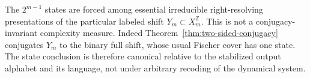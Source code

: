 \begin{remark}
The $2^{m-1}$ states are forced among essential irreducible right-resolving
presentations of the particular labeled shift $Y_m\subset X_m^{\mathbb Z}$.
This is not a conjugacy-invariant complexity measure.  Indeed
Theorem~\ref{thm:two-sided-conjugacy} conjugates $Y_m$ to the binary full
shift, whose usual Fischer cover has one state.  The state conclusion is
therefore canonical relative to the stabilized output alphabet and its
language, not under arbitrary recoding of the dynamical system.
\end{remark}

